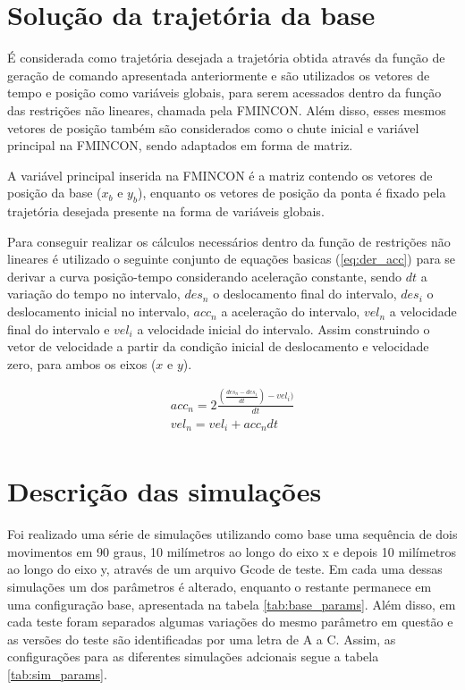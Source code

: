 \section{Solução da trajetória da base}

É considerada como trajetória desejada a trajetória obtida através da função de geração de comando apresentada anteriormente
e são utilizados os vetores de tempo e posição como variáveis globais, para serem acessados dentro da função das
restrições não lineares, chamada pela FMINCON.
Além disso, esses mesmos vetores de posição também são considerados como o chute inicial e variável principal
na FMINCON, sendo adaptados em forma de matriz.

A variável principal inserida na FMINCON é a matriz contendo os vetores de posição da base ($x_b$ e $y_b$),
enquanto os vetores de posição da ponta é fixado pela trajetória desejada presente na forma de variáveis globais.

Para conseguir realizar os cálculos necessários dentro da função de restrições não lineares é utilizado o seguinte conjunto
de equações basicas (\ref{eq:der_acc}) para se derivar a curva posição-tempo considerando aceleração constante,
sendo $dt$ a variação do tempo no intervalo, $des_n$ o deslocamento final do intervalo, $des_i$ o deslocamento inicial no intervalo,
$acc_n$ a aceleração do intervalo, $vel_n$ a velocidade final do intervalo e $vel_i$ a velocidade inicial do intervalo.
Assim construindo o vetor de velocidade a partir da condição inicial de deslocamento e velocidade zero, para ambos os eixos ($x$ e $y$).

\begin{equation}
    \label{eq:der_acc}
    \begin{split}        
        acc_n = 2\frac{(\frac{des_n-des_i}{dt})-vel_i)}{dt} \\
        vel_n = vel_i+acc_ndt \\
    \end{split}
\end{equation}

\section{Descrição das simulações}

Foi realizado uma série de simulações utilizando como base uma sequência de dois movimentos em 90 graus,
10 milímetros ao longo do eixo x e depois 10 milímetros ao longo do eixo y, através de um arquivo Gcode de teste.
Em cada uma dessas simulações um dos parâmetros é alterado, enquanto o restante permanece em uma configuração
base, apresentada na tabela \ref{tab:base_params}. Além disso, em cada teste foram separados algumas variações do mesmo
parâmetro em questão e as versões do teste são identificadas por uma letra de A a C.
Assim, as configurações para as diferentes simulações adcionais segue a tabela \ref{tab:sim_params}.


